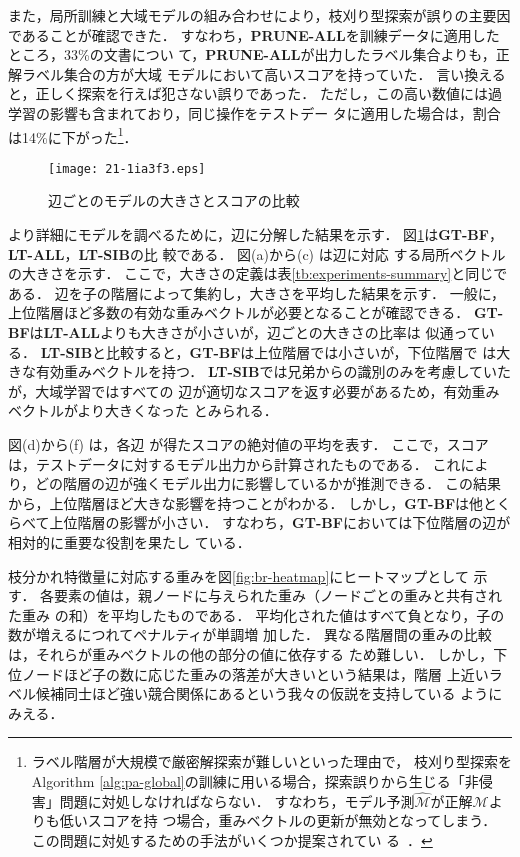 \documentclass[japanese]{jnlp_1.4}
\begin{document}
また，局所訓練と大域モデルの組み合わせにより，枝刈り型探索が誤りの主要因
であることが確認できた．
すなわち，{\bf PRUNE-ALL}を訓練データに適用したところ，33\%の文書につい
て，{\bf PRUNE-ALL}が出力したラベル集合よりも，正解ラベル集合の方が大域
モデルにおいて高いスコアを持っていた．
言い換えると，正しく探索を行えば犯さない誤りであった．
ただし，この高い数値には過学習の影響も含まれており，同じ操作をテストデー
タに適用した場合は，割合は14\%に下がった\footnote{
ラベル階層が大規模で厳密解探索が難しいといった理由で，
枝刈り型探索を Algorithm \ref{alg:pa-global}の訓練に用いる場合，探索誤りから生じる「非侵
害」問題に対処しなければならない．
すなわち，モデル予測$\hat{\mathcal{M}}$が正解$\mathcal{M}$よりも低いスコアを持
つ場合，重みベクトルの更新が無効となってしまう．
この問題に対処するための手法がいくつか提案されてい
る~\cite{Collins2004full,Huang2012full}．}．


\begin{figure}[b]
\begin{center}
\texttt{[image: 21-1ia3f3.eps]}
\end{center}
\caption{辺ごとのモデルの大きさとスコアの比較}
\label{fig:size-score-comp}
\end{figure}


より詳細にモデルを調べるために，辺に分解した結果を示す．
図\ref{fig:size-score-comp}は{\bf GT-BF}，{\bf LT-ALL}，{\bf LT-SIB}の比
較である．
    図(a)から(c) は辺に対応
する局所ベクトルの大きさを示す．
ここで，大きさの定義は表\ref{tb:experiments-summary}と同じである．
辺を子の階層によって集約し，大きさを平均した結果を示す．
一般に，上位階層ほど多数の有効な重みベクトルが必要となることが確認できる．
{\bf GT-BF}は{\bf LT-ALL}よりも大きさが小さいが，辺ごとの大きさの比率は
似通っている．
{\bf LT-SIB}と比較すると，{\bf GT-BF}は上位階層では小さいが，下位階層で
は大きな有効重みベクトルを持つ．
{\bf LT-SIB}では兄弟からの識別のみを考慮していたが，大域学習ではすべての
辺が適切なスコアを返す必要があるため，有効重みベクトルがより大きくなった
とみられる．

    図(d)から(f) は，各辺
が得たスコアの絶対値の平均を表す．
ここで，スコアは，テストデータに対するモデル出力から計算されたものである．
これにより，どの階層の辺が強くモデル出力に影響しているかが推測できる．
この結果から，上位階層ほど大きな影響を持つことがわかる．
しかし，{\bf GT-BF}は他とくらべて上位階層の影響が小さい．
すなわち，{\bf GT-BF}においては下位階層の辺が相対的に重要な役割を果たし
ている．

枝分かれ特徴量に対応する重みを図\ref{fig:br-heatmap}にヒートマップとして
 示す．
各要素の値は，親ノードに与えられた重み（ノードごとの重みと共有された重み
 の和）を平均したものである．
平均化された値はすべて負となり，子の数が増えるにつれてペナルティが単調増
 加した．
異なる階層間の重みの比較は，それらが重みベクトルの他の部分の値に依存する
 ため難しい．
しかし，下位ノードほど子の数に応じた重みの落差が大きいという結果は，階層
上近いラベル候補同士ほど強い競合関係にあるという我々の仮説を支持している
ようにみえる．
\end{document}
